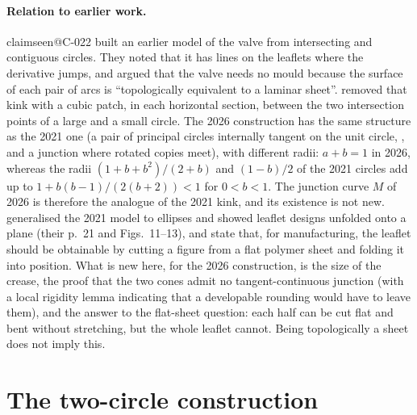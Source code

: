 \documentclass[11pt,a4paper]{article}
\makeatletter
\theoremstyle{plain}
\theoremstyle{remark}
\newcommand{\claim}[1]{\ifcsname claimseen@#1\endcsname\else\expandafter\gdef\csname claimseen@#1\endcsname{}\label{claim:#1}\fi}
\makeatother
\begin{document}
\paragraph{Relation to earlier work.}\claim{C-022} \citet{McKee2021} built an earlier model of the valve from
intersecting and contiguous circles. They noted that it has lines on the leaflets where the derivative jumps, and argued
that the valve needs no mould because the surface of each pair of arcs is ``topologically equivalent to a laminar sheet''.
\citet{Rebolledo2023} removed that kink with a cubic patch, in each horizontal section, between the two intersection points
of a large and a small circle. The 2026 construction has the same structure as the 2021 one (a pair of principal circles
internally tangent on the unit circle, \citealp[eqs.~(5)--(6)]{McKee2021}, and a junction where rotated copies meet), with
different radii: $a+b=1$ in 2026, whereas the radii $(1+b+b^2)/(2+b)$ and $(1-b)/2$ of the 2021 circles
\citep[eqs.~(3.2)--(3.3)]{Rebolledo2023} add up to $1+b(b-1)/(2(b+2))<1$ for $0<b<1$. The junction curve $M$ of 2026 is
therefore the analogue of the 2021 kink, and its existence is not new. \citet{Oliveira2022} generalised the 2021 model to
ellipses and showed leaflet designs unfolded onto a plane (their p.~21 and Figs.~11--13), and \citet{Oliveira2024} state
that, for manufacturing, the leaflet should be obtainable by cutting a figure from a flat polymer sheet and folding it into
position. What is new here, for the 2026 construction, is the size of the crease, the proof that the two cones admit no
tangent-continuous junction (with a local rigidity lemma indicating that a developable rounding would have to leave them),
and the answer to the flat-sheet question: each half can be cut flat and bent without stretching, but the whole leaflet
cannot. Being topologically a sheet does not imply this.

\section{The two-circle construction}\label{sec:construction}
\end{document}
